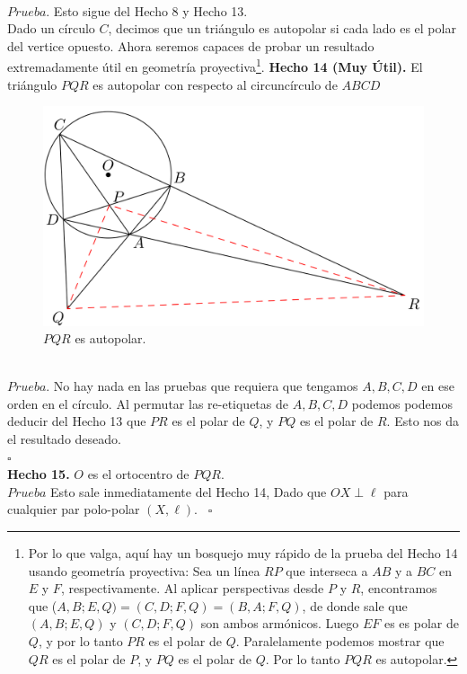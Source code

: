 \documentclass[11pt, a4paper]{article}
\begin{document}
	\\
	$Prueba$. Esto sigue del Hecho 8 y Hecho 13.
	\\
	Dado un c\'irculo $C$, decimos que un tri\'angulo es autopolar si cada lado es el polar del vertice opuesto.
	 \setcounter{footnote}{2}
	Ahora seremos capaces de probar un resultado extremadamente \'util en geometr\'ia proyectiva\footnote{Por lo que valga, aqu\'i hay un bosquejo muy r\'apido de la prueba del Hecho 14 usando geometr\'ia proyectiva: Sea un l\'inea $RP$ que interseca a $AB$ y a $BC$ en $E$ y $F$, respectivamente. Al aplicar perspectivas desde $P$ y $R$, encontramos que ($A,B;E,Q) = (C,D;F,Q) = (B,A;F,Q)$, de donde sale que $(A,B;E,Q)$ y $(C,D;F,Q)$ son ambos arm\'onicos. Luego $EF$ es es polar de $Q$, y por lo tanto $PR$ es el polar de $Q$. Paralelamente podemos mostrar que $QR$ es el polar de $P$, y $PQ$ es el polar de $Q$. Por lo tanto $PQR$ es autopolar.}.
	\newpage
	\setcounter{figure}{8}
	\textbf{Hecho 14 (Muy \'Util).} El tri\'angulo $PQR$ es autopolar con respecto al circunc\'irculo de $ABCD$
	\begin{figure}[h]
		\centering
		\includegraphics[scale=0.4]{p7.1 - copia}
		\caption{$PQR$ es autopolar.}
	\end{figure}
\\
	$Prueba$. No hay nada en las pruebas que requiera que tengamos $A, B, C, D$ en ese orden en el c\'irculo. Al permutar las re-etiquetas de $A, B, C, D$ podemos podemos deducir del Hecho 13 que $PR$ es el polar de $Q$, y $PQ$ es el polar de $R$. Esto nos da el resultado deseado.\\
	$\square$\\
	\textbf{Hecho 15.} $O$ es el ortocentro de $PQR$.\\
	
	$Prueba$ Esto sale inmediatamente del Hecho 14, Dado que $OX \perp \ell$ para cualquier par polo-polar $(X,\ell)$. \ $\square$
\end{document}
